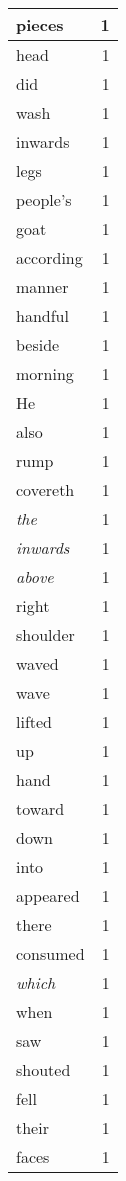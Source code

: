 \begin{center}
\begin{longtable}{l|r}
pieces & 1 \\ \hline
head & 1 \\ \hline
did & 1 \\ \hline
wash & 1 \\ \hline
inwards & 1 \\ \hline
legs & 1 \\ \hline
people's & 1 \\ \hline
goat & 1 \\ \hline
according & 1 \\ \hline
manner & 1 \\ \hline
handful & 1 \\ \hline
beside & 1 \\ \hline
morning & 1 \\ \hline
He & 1 \\ \hline
also & 1 \\ \hline
rump & 1 \\ \hline
covereth & 1 \\ \hline
\emph{the} & 1 \\ \hline
\emph{inwards} & 1 \\ \hline
\emph{above} & 1 \\ \hline
right & 1 \\ \hline
shoulder & 1 \\ \hline
waved & 1 \\ \hline
wave & 1 \\ \hline
lifted & 1 \\ \hline
up & 1 \\ \hline
hand & 1 \\ \hline
toward & 1 \\ \hline
down & 1 \\ \hline
into & 1 \\ \hline
appeared & 1 \\ \hline
there & 1 \\ \hline
consumed & 1 \\ \hline
\emph{which} & 1 \\ \hline
when & 1 \\ \hline
saw & 1 \\ \hline
shouted & 1 \\ \hline
fell & 1 \\ \hline
their & 1 \\ \hline
faces & 1 \\ \hline
\end{longtable}
\end{center}



